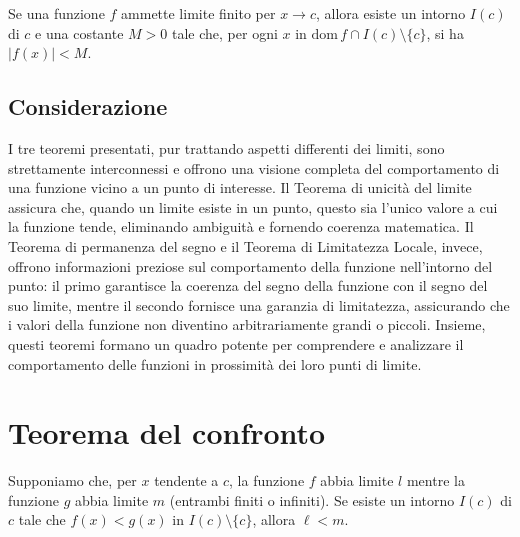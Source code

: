 \documentclass{book}
\begin{document}
\begin{theorem}
    Se una funzione \( f \) ammette limite finito per \( x \to c \), allora esiste un intorno \( I(c) \) di \( c \) e una costante \( M > 0 \) tale che, per ogni \( x \) in \( \text{dom}\,f \cap I(c) \setminus \{c\} \), si ha \( |f(x)| < M \).
\end{theorem}

\subsection*{Considerazione}

I tre teoremi presentati, pur trattando aspetti differenti dei limiti, sono strettamente interconnessi e offrono una visione completa del comportamento di una funzione vicino a un punto di interesse. Il Teorema di unicità del limite assicura che, quando un limite esiste in un punto, questo sia l'unico valore a cui la funzione tende, eliminando ambiguità e fornendo coerenza matematica. Il Teorema di permanenza del segno e il Teorema di Limitatezza Locale, invece, offrono informazioni preziose sul comportamento della funzione nell'intorno del punto: il primo garantisce la coerenza del segno della funzione con il segno del suo limite, mentre il secondo fornisce una garanzia di limitatezza, assicurando che i valori della funzione non diventino arbitrariamente grandi o piccoli. Insieme, questi teoremi formano un quadro potente per comprendere e analizzare il comportamento delle funzioni in prossimità dei loro punti di limite.

\section{Teorema del confronto}

\begin{theorem}
    Supponiamo che, per \( x \) tendente a \( c \), la funzione \( f \) abbia limite \( l \) mentre la funzione \( g \) abbia limite \( m \) (entrambi finiti o infiniti). Se esiste un intorno \( I(c) \) di \( c \) tale che \( f(x) < g(x) \) in \( I(c) \setminus \{c\} \), allora \( \ell < m \).
\end{theorem}
\end{document}
